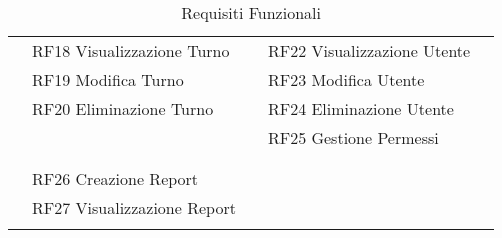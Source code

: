 \documentclass[green, fancy, 11pt]{elegantbook}
\begin{document}
\begin{table}[H]
\begin{tabular}{|p{0.2cm} p{2.5cm} p{2cm} p{0.2cm} p{2.5cm} p{1cm} p{0.2cm}|}
	&\multicolumn{2}{|l|}{RF18 Visualizzazione Turno}&&\multicolumn{2}{|l|}{RF22 Visualizzazione Utente}&\\
	&\multicolumn{2}{|l|}{RF19 Modifica Turno}&&\multicolumn{2}{|l|}{RF23 Modifica Utente}&\\
	&\multicolumn{2}{|l|}{RF20 Eliminazione Turno}&&\multicolumn{2}{|l|}{RF24 Eliminazione Utente}&\\
	\cline{2-3}
	&&&&\multicolumn{2}{|l|}{RF25 Gestione Permessi}&\\ 
	\cline{5-6}
	&&&&&&\\
	\cline{2-3}
	&\multicolumn{2}{|l|}{\cellcolor{RussianGreen}{\textcolor{white}{GESTIONE REPORT}}}&&&&\\
	\cline{2-3}
	&\multicolumn{2}{|l|}{RF26 Creazione Report}&&&&\\
	&\multicolumn{2}{|l|}{RF27 Visualizzazione Report}&&&&\\
	\cline{2-3}
	&&&&&&\\
	\hline
\end{tabular}
	\caption{Requisiti Funzionali}
\end{table}

\newpage
\end{document}
